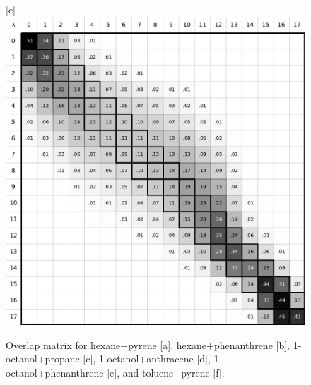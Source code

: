 \documentclass[
	12pt,				%
	openany,			%
	oneside,			%
	a4paper,			%
	english,			%
	brazil				%
	]{abntex2}
\begin{document}
\begin{apendicesenv}
\begin{figure}
	[e]{{\includegraphics[width=.42\textwidth]{Figures/ooct_phen} }}%
	\qquad	
	\caption{Overlap matrix for hexane+pyrene [a], hexane+phenanthrene [b], 1-octanol+propane [c], 1-octanol+anthracene [d], 1-octanol+phenanthrene [e], and toluene+pyrene [f].}%
	\label{fig:over1}%
\end{figure}



\end{apendicesenv}
\end{document}
